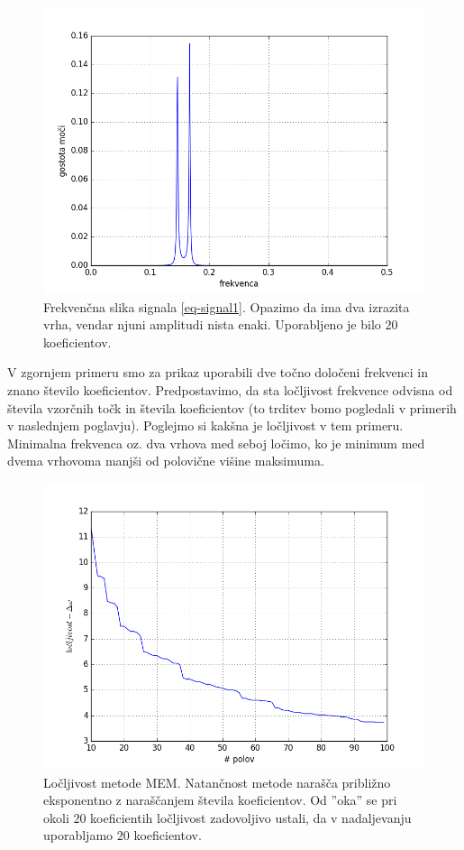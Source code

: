 \documentclass[slovene,11pt,a4paper]{article}
\numberwithin{equation}{section} %
\numberwithin{figure}{section} %
\numberwithin{table}{section} %
\begin{document}
\begin{figure}[!htb]
\centering
\includegraphics[scale=0.5]{slike/sin_2_frekvenci_osnovno.png}
\caption{Frekvenčna slika signala \ref{eq-signal1}. Opazimo da ima dva izrazita vrha, vendar njuni amplitudi nista enaki. Uporabljeno je bilo $20$ koeficientov.}
\end{figure}

V zgornjem primeru smo za prikaz uporabili dve točno določeni frekvenci in znano število koeficientov. Predpostavimo, da sta ločljivost frekvence odvisna od števila vzorčnih točk in števila koeficientov (to trditev bomo pogledali v primerih v naslednjem poglavju). Poglejmo si kakšna je ločljivost v tem primeru. Minimalna frekvenca oz. dva vrhova med seboj ločimo, ko je minimum med dvema vrhovoma manjši od polovične višine maksimuma.

\begin{figure}[!htb]
\centering
\includegraphics[scale=0.4]{slike/locljivost_mem_stevilo_polov.png}
\caption{Ločljivost metode MEM. Natančnost metode narašča približno eksponentno z naraščanjem števila koeficientov. Od ''oka'' se pri okoli $20$ koeficientih ločljivost zadovoljivo ustali, da v nadaljevanju uporabljamo $20$ koeficientov. }
\end{figure}
\end{document}
